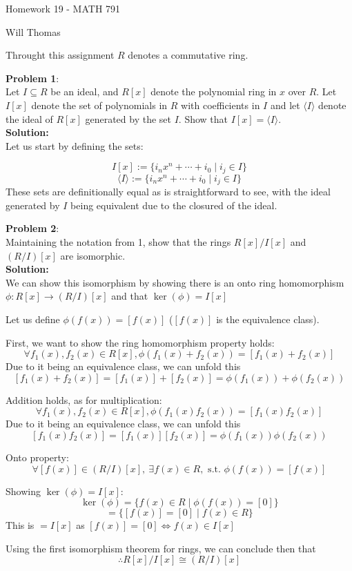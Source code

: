 \documentclass[11pt]{article}
\newcommand{\prob}[3]{\begin{flushleft}
        \textbf{Problem #1}: \\
        #2 
		\textbf{Solution:} 
		#3

\end{flushleft}}
\newcommand{\makeHWtitle}[1]{
    \begin{center}
    \Large{Homework #1 - MATH 791} 
        \vspace{5pt}
        
        \normalsize{Will Thomas}
        \vspace{5pt}
    \end{center}
}
\begin{document}
\makeHWtitle{19}
Throught this assignment $R$ denotes a commutative ring.

\prob{1}{
  Let $I \subseteq R$ be an ideal, and $R[x]$ denote the polynomial ring in $x$ over $R$. Let $I[x]$ denote the set of polynomials in $R$ with coefficients in $I$ and let $\langle I \rangle$ denote the ideal of $R[x]$ generated by the set $I$.
  Show that $I[x] = \langle I \rangle$. \\
}{ \\
  Let us start by defining the sets:

  $$I[x] := \{ i_nx^n + \cdots + i_0 \mid i_j \in I \}$$
  $$\langle I \rangle := \{ i_nx^n + \cdots + i_0 \mid i_j \in I \}$$
  These sets are definitionally equal as is straightforward to see, with
  the ideal generated by $I$ being equivalent due to
  the closured of the ideal.
}

\prob{2}{
Maintaining the notation from 1, show that the rings $R[x]/I[x]$ and $(R/I)[x]$ are isomorphic. \\
}{\\
We can show this isomorphism by showing there is an onto ring homomorphism
$\phi : R[x] \rightarrow (R/I)[x]$ and that $\ker(\phi) = I[x]$

Let us define $\phi(f(x)) = [f(x)]$ ($[f(x)]$ is the equivalence class).

First, we want to show the ring homomorphism property holds:
$$\forall f_1(x), f_2(x) \in R[x], \phi(f_1(x) + f_2(x)) = [f_1(x) + f_2(x)]$$
Due to it being an equivalence class, we can unfold this
$$[f_1(x) + f_2(x)] = [f_1(x)] + [f_2(x)] = \phi(f_1(x)) + \phi(f_2(x))$$

Addition holds, as for multiplication:
$$\forall f_1(x), f_2(x) \in R[x], \phi(f_1(x) f_2(x)) = [f_1(x) f_2(x)]$$
Due to it being an equivalence class, we can unfold this
$$[f_1(x) f_2(x)] = [f_1(x)] [f_2(x)] = \phi(f_1(x)) \phi(f_2(x))$$

Onto property:
$$\forall [f(x)] \in (R/I)[x],\ \exists f(x) \in R, \text{ s.t. } \phi(f(x)) = [f(x)]$$

Showing $\ker(\phi) = I[x]$:
$$\ker(\phi) = \{ f(x) \in R \mid \phi(f(x)) = [0] \}$$
$$= \{ [f(x)] = [0] \mid f(x) \in R \}$$
This is $= I[x]$ as $[f(x)] = [0] \iff f(x) \in I[x]$

Using the first isomorphism theorem for rings, we can conclude then that
$$\therefore R[x]/I[x] \cong (R/I)[x]$$
}
\end{document}
